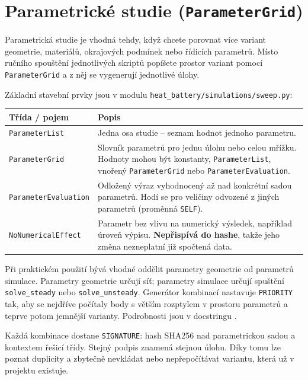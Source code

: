 \documentclass[a4paper,11pt]{article}
\begin{document}
\section{Parametrické studie (\texttt{ParameterGrid})}\label{sec:sweep}

Parametrická studie je vhodná tehdy, když chcete porovnat více variant geometrie,
materiálů, okrajových podmínek nebo řídicích parametrů. Místo ručního spouštění
jednotlivých skriptů popíšete prostor variant pomocí \texttt{ParameterGrid} a
z něj se vygenerují jednotlivé úlohy.

Základní stavební prvky jsou v modulu \texttt{heat\_battery/simulations/sweep.py}:

\begin{longtable}{@{}L{5.2cm} L{9.8cm}@{}}
\toprule
\textbf{Třída / pojem} & \textbf{Popis} \\
\midrule
\endhead
\texttt{ParameterList}
  & Jedna osa studie -- seznam hodnot jednoho parametru. \\
\texttt{ParameterGrid}
  & Slovník parametrů pro jednu úlohu nebo celou mřížku. Hodnoty mohou být
    konstanty, \texttt{ParameterList}, vnořený \texttt{ParameterGrid} nebo
    \texttt{ParameterEvaluation}. \\
\texttt{ParameterEvaluation}
  & Odložený výraz vyhodnocený až nad konkrétní sadou parametrů. Hodí se pro
    veličiny odvozené z jiných parametrů (proměnná \texttt{SELF}). \\
\texttt{NoNumericalEffect}
  & Parametr bez vlivu na numerický výsledek, například úroveň výpisu.
    \textbf{Nepřispívá do hashe}, takže jeho změna nezneplatní již spočtená data. \\
\bottomrule
\end{longtable}

Při praktickém použití bývá vhodné oddělit parametry geometrie od parametrů
simulace. Parametry geometrie určují síť; parametry simulace určují spuštění
\texttt{solve\_steady} nebo \texttt{solve\_unsteady}. Generátor kombinací
nastavuje \texttt{PRIORITY} tak, aby se nejdříve počítaly body s větším
rozptylem v prostoru parametrů a teprve potom jemnější varianty. Podrobnosti
jsou v docstringu .

Každá kombinace dostane \texttt{SIGNATURE}: hash SHA256 nad parametrickou sadou
a kontextem řešicí třídy. Stejný podpis znamená stejnou úlohu. Díky tomu lze
poznat duplicity a zbytečně nevkládat nebo nepřepočítávat variantu, která už v
projektu existuje.
\end{document}
